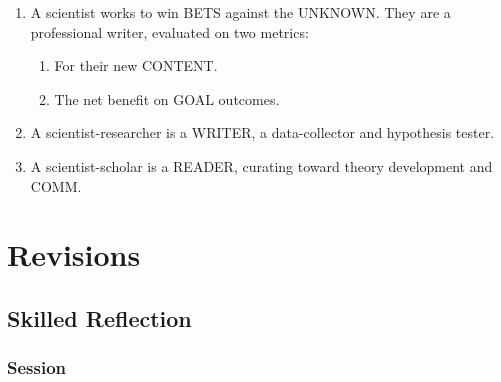 \documentclass[
]{book}
\providecommand{\tightlist}{%
  \setlength{\itemsep}{0pt}\setlength{\parskip}{0pt}}
\begin{document}
\begin{enumerate}
\def\labelenumi{\arabic{enumi}.}
\setcounter{enumi}{46}
\item
  A scientist works to win BETS against the UNKNOWN. They are a
  professional writer, evaluated on two metrics:

  \begin{enumerate}
  \def\labelenumii{\arabic{enumii}.}
  \tightlist
  \item
    For their new CONTENT.
  \item
    The net benefit on GOAL outcomes.
  \end{enumerate}
\item
  A scientist-researcher is a WRITER, a data-collector and hypothesis tester.
\item
  A scientist-scholar is a READER, curating toward theory development and COMM.
\end{enumerate}

\hypertarget{revisions}{%
\chapter{Revisions}\label{revisions}}

\hypertarget{skilled-reflection}{%
\section{Skilled Reflection}\label{skilled-reflection}}

\hypertarget{session}{%
\subsection{Session}\label{session}}
\end{document}
